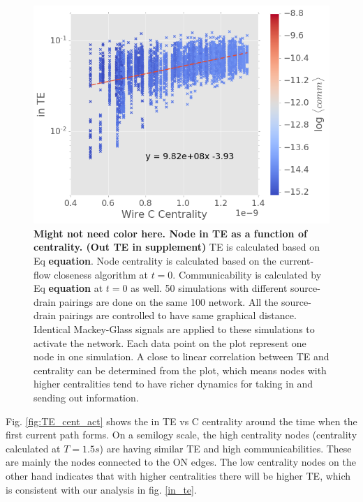 \documentclass[%
 reprint,
 amsmath,amssymb,
 aps,
]{revtex4-2}
\begin{document}
\begin{figure}[h]
	\centering
	\includegraphics[width=1\linewidth]{figure/in_TE}
	\caption{\textbf{Might not need color here. Node in TE as a function of centrality. (Out TE in  supplement)} TE is calculated based on Eq \textbf{equation}. Node centrality is calculated based on the current-flow closeness algorithm at $t = 0$. Communicability is calculated by Eq \textbf{equation} at $t = 0$ as well. 50 simulations with different source-drain pairings are done on the same 100 network. All the source-drain pairings are controlled to have same graphical distance. Identical Mackey-Glass signals are applied to these simulations to activate the network. Each data point on the plot represent one node in one simulation. A close to linear correlation between TE and centrality can be determined from the plot, which means nodes with higher centralities tend to have richer dynamics for taking in and sending out information.}
	\label{fig:in_te}
\end{figure}

Fig. \ref{fig:TE_cent_act} shows the in TE vs C centrality around the time when the first current path forms. On a semilogy scale, the high centrality nodes (centrality calculated at $T = 1.5 s$) are having similar TE and high communicabilities. These are mainly the nodes connected to the ON edges. The low centrality nodes on the other hand indicates that with higher centralities there will be higher TE, which is consistent with our analysis in fig. \ref{in_te}.
\end{document}
